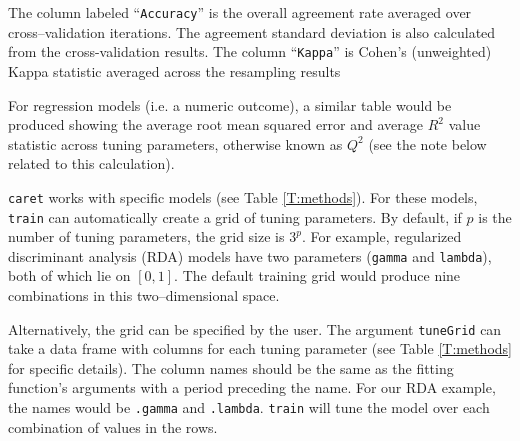 \documentclass[12pt]{article}
\begin{document}
The column labeled ``\texttt{Accuracy}'' is the overall agreement rate averaged over cross--validation iterations. The agreement standard deviation is also calculated from the cross-validation results. The column ``\texttt{Kappa}'' is Cohen's (unweighted) Kappa statistic  averaged across the resampling results


For regression models (i.e. a numeric outcome), a similar table would be produced showing the average root mean squared error and average $R^2$ value statistic across tuning parameters, otherwise known as $Q^2$ (see the note below related to this calculation).

\texttt{caret} works with specific models (see Table \ref{T:methods}). For these models, \texttt{train} can automatically create a grid of tuning parameters. By default, if $p$ is the number of tuning parameters, the grid size is $3^p$. For example, regularized discriminant analysis (RDA) models have two  parameters (\texttt{gamma} and \texttt{lambda}), both of which lie on $[0, 1]$. The default training grid would produce nine combinations in this two--dimensional space.

Alternatively, the grid can be specified by the user. The argument \texttt{tuneGrid} can take a data frame with columns for each tuning parameter (see Table \ref{T:methods} for specific details). The column names should be the same as the fitting function's arguments with a period preceding the name. For our RDA example, the names would be \texttt{.gamma} and \texttt{.lambda}. \texttt{train} will tune the model over each combination of values in the rows.
\end{document}
